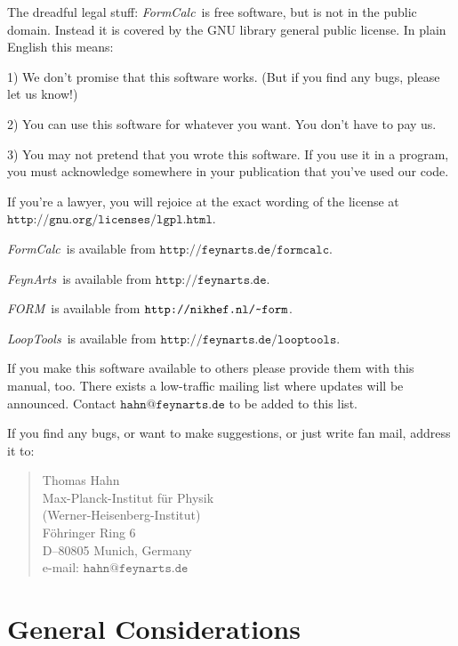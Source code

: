 \documentclass[twoside,11pt]{article}
\def\FA{\textit{FeynArts}}
\def\FC{\textit{FormCalc}}
\def\FO{\textit{FORM}}
\def\LT{\textit{LoopTools}}
\def\Code#1{\ensuremath{\texttt{#1}}}
\def\home{\symbol{126}}
\begin{document}
\begin{scriptsize}
The dreadful legal stuff:
\FC\ is free software, but is not in the public domain.
Instead it is covered by the GNU library general public license.
In plain English this means:

1) We don't promise that this software works.   
(But if you find any bugs, please let us know!)

2) You can use this software for whatever you want.
You don't have to pay us.

3) You may not pretend that you wrote this software.
If you use it in a program, you must acknowledge
somewhere in your publication that you've used  
our code.

If you're a lawyer, you will rejoice at the exact wording of the license 
at \Code{http://gnu.org/licenses/lgpl.html}.

\FC\ is available from \Code{http://feynarts.de/formcalc}.

\FA\ is available from \Code{http://feynarts.de}.

\FO\ is available from \Code{http://nikhef.nl/\home form}.

\LT\ is available from \Code{http://feynarts.de/looptools}.

If you make this software available to others please provide them with
this manual, too.  There exists a low-traffic mailing list where updates 
will be announced.  Contact \Code{hahn@feynarts.de} to be added to this
list.

If you find any bugs, or want to make suggestions, or just write fan mail,
address it to:
\vspace*{-2ex}
\begin{quote}
Thomas Hahn \\
Max-Planck-Institut f\"ur Physik \\
(Werner-Heisenberg-Institut) \\
F\"ohringer Ring 6 \\
D--80805 Munich, Germany \\
e-mail: \Code{hahn@feynarts.de}
\end{quote}
\end{scriptsize}

\clearpage

\tableofcontents

\clearpage

\section{General Considerations}
\label{sect:general}
\end{document}
